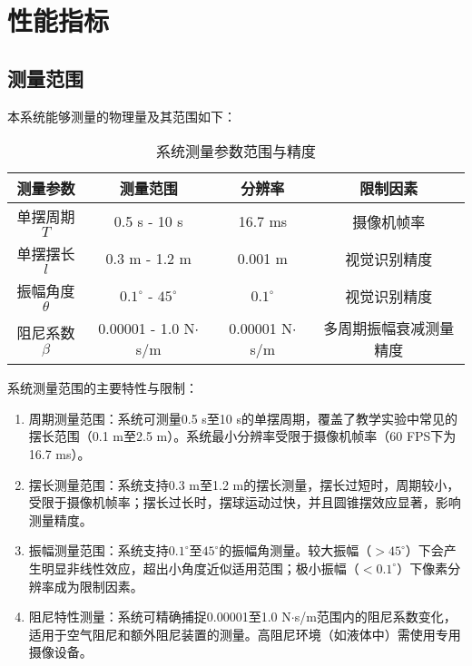 \section{性能指标}
\subsection{测量范围}
本系统能够测量的物理量及其范围如下：

\begin{table}[ht]
\centering
\caption{系统测量参数范围与精度}
\begin{tabular}{@{}c c c c@{}}
\toprule
\textbf{测量参数} & \textbf{测量范围} & \textbf{分辨率} & \textbf{限制因素} \\
\midrule
单摆周期 $T$ & 0.5 s - 10 s & 16.7 ms & 摄像机帧率 \\
单摆摆长 $l$ & 0.3 m - 1.2 m & 0.001 m & 视觉识别精度 \\
振幅角度 $\theta$ & $0.1^{\circ}$ - $45^{\circ}$ & $0.1^{\circ}$ & 视觉识别精度 \\
阻尼系数 $\beta$ & 0.00001 - 1.0 N$\cdot$s/m & 0.00001 N$\cdot$s/m & 多周期振幅衰减测量精度 \\
\bottomrule
\end{tabular}
\label{tab:measurement_range}
\end{table}

系统测量范围的主要特性与限制：

\begin{enumerate}[leftmargin=*]
    \item 周期测量范围：系统可测量0.5 s至10 s的单摆周期，覆盖了教学实验中常见的摆长范围（0.1 m至2.5 m）。系统最小分辨率受限于摄像机帧率（60 FPS下为16.7 ms）。
    
    \item 摆长测量范围：系统支持0.3 m至1.2 m的摆长测量，摆长过短时，周期较小，受限于摄像机帧率；摆长过长时，摆球运动过快，并且圆锥摆效应显著，影响测量精度。
    
    \item 振幅测量范围：系统支持$0.1^{\circ}$至$45^{\circ}$的振幅角测量。较大振幅（$>45^{\circ}$）下会产生明显非线性效应，超出小角度近似适用范围；极小振幅（$<0.1^{\circ}$）下像素分辨率成为限制因素。
        
    \item 阻尼特性测量：系统可精确捕捉0.00001至1.0 N$\cdot$s/m范围内的阻尼系数变化，适用于空气阻尼和额外阻尼装置的测量。高阻尼环境（如液体中）需使用专用摄像设备。
\end{enumerate}


